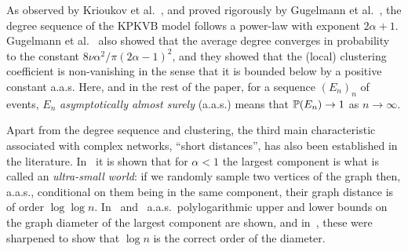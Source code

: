 As observed by Krioukov et al.~\cite{krioukov2010hyperbolic}, and proved rigorously by Gugelmann et al.~\cite{gugelmann2012random}, the degree sequence of the KPKVB model follows a power-law with exponent $2\alpha+1$.
% 
% 
%
%
Gugelmann et al.~\cite{gugelmann2012random} also showed that the average degree converges in probability to the constant $8\nu\alpha^2/ \pi (2\alpha-1)^2$, and they showed that the (local) clustering coefficient is non-vanishing in the sense that it is bounded below by a positive constant a.a.s. Here, and in the rest of the paper, for a sequence $(E_n)_n$ of events, $E_n$ {\em asymptotically almost surely} (a.a.s.) means that $\mathbb{P}(E_n)\to 1$ as $n \to \infty$.

Apart from the degree sequence and clustering, the third main characteristic associated with complex networks, ``short distances'', has also been established in the literature. In~\cite{abdullah2017typical} it is shown that for $\alpha < 1$ the largest component is what is called an \emph{ultra-small world}: if we randomly sample two vertices of the graph then, a.a.s., conditional on them being in the same component, their graph distance is of order $\log\log n$. In~\cite{kiwi2015bound} and~\cite{friedrich2018diameter} a.a.s.~polylogarithmic upper and lower bounds on the graph diameter of the largest component are shown, and in~\cite{muller2017diameter}, these were sharpened to show that $\log n$ is the correct order of the diameter.

